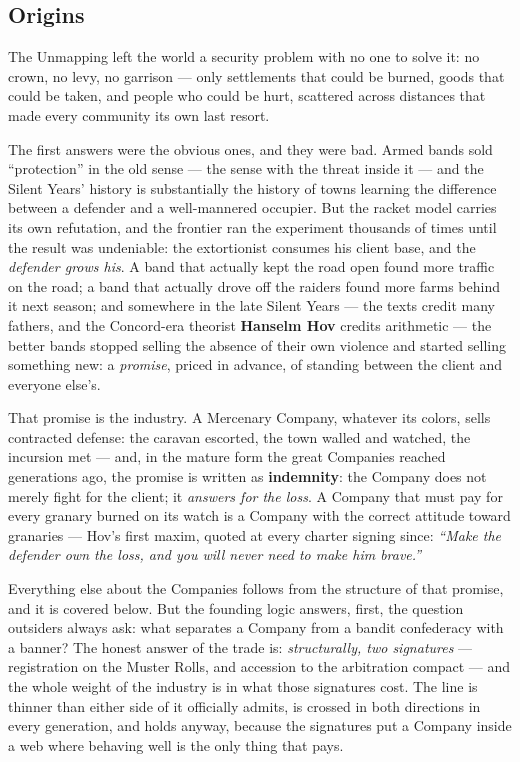 \subsection{Origins}

The Unmapping left the world a security problem with no one to solve it: no crown, no levy, no garrison --- only settlements that could be burned, goods that could be taken, and people who could be hurt, scattered across distances that made every community its own last resort.

The first answers were the obvious ones, and they were bad. Armed bands sold ``protection'' in the old sense --- the sense with the threat inside it --- and the Silent Years' history is substantially the history of towns learning the difference between a defender and a well-mannered occupier. But the racket model carries its own refutation, and the frontier ran the experiment thousands of times until the result was undeniable: the extortionist consumes his client base, and the \textit{defender grows his}. A band that actually kept the road open found more traffic on the road; a band that actually drove off the raiders found more farms behind it next season; and somewhere in the late Silent Years --- the texts credit many fathers, and the Concord-era theorist \textbf{Hanselm Hov} credits arithmetic --- the better bands stopped selling the absence of their own violence and started selling something new: a \textit{promise}, priced in advance, of standing between the client and everyone else's.

That promise is the industry. A Mercenary Company, whatever its colors, sells contracted defense: the caravan escorted, the town walled and watched, the incursion met --- and, in the mature form the great Companies reached generations ago, the promise is written as \textbf{indemnity}: the Company does not merely fight for the client; it \textit{answers for the loss}. A Company that must pay for every granary burned on its watch is a Company with the correct attitude toward granaries --- Hov's first maxim, quoted at every charter signing since: \textit{``Make the defender own the loss, and you will never need to make him brave.''}

Everything else about the Companies follows from the structure of that promise, and it is covered below. But the founding logic answers, first, the question outsiders always ask: what separates a Company from a bandit confederacy with a banner? The honest answer of the trade is: \textit{structurally, two signatures} --- registration on the Muster Rolls, and accession to the arbitration compact --- and the whole weight of the industry is in what those signatures cost. The line is thinner than either side of it officially admits, is crossed in both directions in every generation, and holds anyway, because the signatures put a Company inside a web where behaving well is the only thing that pays.

